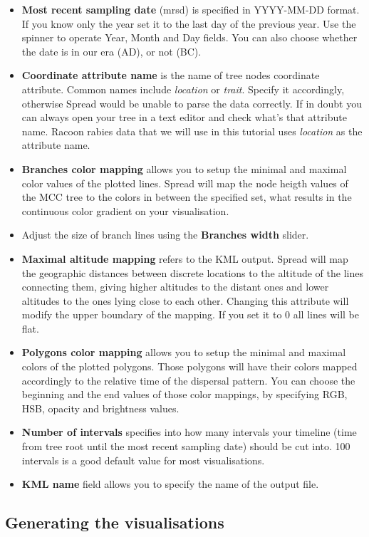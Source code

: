 \begin{itemize}
\item \textbf{Most recent sampling date} (mrsd) is specified in YYYY-MM-DD
format. If you know only the year set it to the last day of the previous
year. Use the spinner to operate Year, Month and Day fields. You can
also choose whether the date is in our era (AD), or not (BC). 
\item \textbf{Coordinate attribute name} is the name of tree nodes coordinate
attribute. Common names include \textsl{location} or \textsl{trait}.
Specify it accordingly, otherwise Spread would be unable to parse
the data correctly. If in doubt you can always open your tree in a
text editor and check what's that attribute name. Racoon rabies data
that we will use in this tutorial uses \textsl{location }as the attribute
name.
\item \textbf{Branches color mapping} allows you to setup the minimal and
maximal color values of the plotted lines. Spread will map the node
heigth values of the MCC tree to the colors in between the specified
set, what results in the continuous color gradient on your visualisation.
\item Adjust the size of branch lines using the \textbf{Branches width}
slider.
\item \textbf{Maximal altitude mapping} refers to the KML output. Spread
will map the geographic distances between discrete locations to the
altitude of the lines connecting them, giving higher altitudes to
the distant ones and lower altitudes to the ones lying close to each
other. Changing this attribute will modify the upper boundary of the
mapping. If you set it to 0 all lines will be flat.
\item \textbf{Polygons color mapping} allows you to setup the minimal and
maximal colors of the plotted polygons. Those polygons will have their
colors mapped accordingly to the relative time of the dispersal pattern.
You can choose the beginning and the end values of those color mappings,
by specifying RGB, HSB, opacity and brightness values.
\item \textbf{Number of intervals} specifies into how many intervals your
timeline (time from tree root until the most recent sampling date)
should be cut into. 100 intervals is a good default value for most
visualisations.
\item \textbf{KML name} field allows you to specify the name of the output
file.
\end{itemize}

\subsection{Generating the visualisations}

